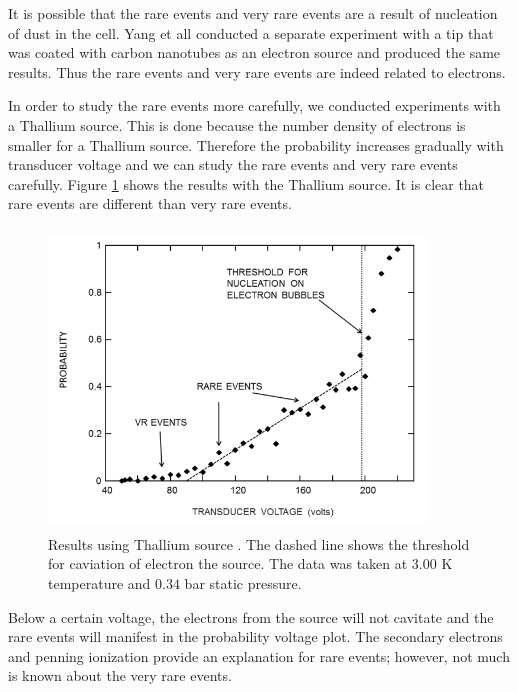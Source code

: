 It is possible that the rare events and very rare events are a result of nucleation of dust in the cell. Yang et all \cite{Yang2018thesis} conducted a separate experiment with a tip that was coated with carbon nanotubes as an electron source and produced the same results. Thus the rare events and very rare events are indeed related to electrons.

In order to study the rare events more carefully, we conducted experiments with a Thallium source. This is done because the number density of electrons is smaller for a Thallium source. Therefore the probability increases gradually with transducer voltage and we can study the rare events and very rare events carefully. Figure \ref{probVoltageThallium} shows the results with the Thallium source. It is clear that rare events are different than very rare events.
\begin{figure}[H]
\centering 
\includegraphics[width=100mm, height=80mm]{Nucleation_Experiment/thalliumSource.png}
\caption{Results using Thallium source \cite{Yang2018thesis}. The dashed line shows the threshold for caviation of electron the source. The data was taken at $3.00$ K temperature and $0.34$ bar static pressure.}
\label{probVoltageThallium}
\end{figure}
Below a certain voltage, the electrons from the source will not cavitate and the rare events will manifest in the probability voltage plot. The secondary electrons and penning ionization provide an explanation for rare events; however, not much is known about the very rare events.
